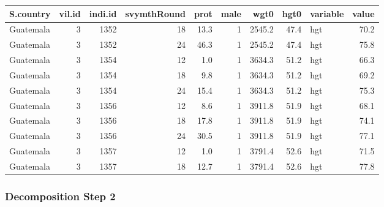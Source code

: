 \documentclass[
]{book}
\newenvironment{Shaded}{\begin{snugshade}}{\end{snugshade}}
\newcommand{\CommentTok}[1]{\textcolor[rgb]{0.56,0.35,0.01}{\textit{#1}}}
\newcommand{\DataTypeTok}[1]{\textcolor[rgb]{0.13,0.29,0.53}{#1}}
\newcommand{\DecValTok}[1]{\textcolor[rgb]{0.00,0.00,0.81}{#1}}
\newcommand{\KeywordTok}[1]{\textcolor[rgb]{0.13,0.29,0.53}{\textbf{#1}}}
\newcommand{\NormalTok}[1]{#1}
\newcommand{\OperatorTok}[1]{\textcolor[rgb]{0.81,0.36,0.00}{\textbf{#1}}}
\newcommand{\StringTok}[1]{\textcolor[rgb]{0.31,0.60,0.02}{#1}}
\begin{document}
\begin{table}[!h]
\centering
\begin{tabular}{l|r|r|r|r|r|r|r|l|r}
\hline
S.country & vil.id & indi.id & svymthRound & prot & male & wgt0 & hgt0 & variable & value\\
\hline
\rowcolor{gray!6}  Guatemala & 3 & 1352 & 18 & 13.3 & 1 & 2545.2 & 47.4 & hgt & 70.2\\
\hline
Guatemala & 3 & 1352 & 24 & 46.3 & 1 & 2545.2 & 47.4 & hgt & 75.8\\
\hline
\rowcolor{gray!6}  Guatemala & 3 & 1354 & 12 & 1.0 & 1 & 3634.3 & 51.2 & hgt & 66.3\\
\hline
Guatemala & 3 & 1354 & 18 & 9.8 & 1 & 3634.3 & 51.2 & hgt & 69.2\\
\hline
\rowcolor{gray!6}  Guatemala & 3 & 1354 & 24 & 15.4 & 1 & 3634.3 & 51.2 & hgt & 75.3\\
\hline
Guatemala & 3 & 1356 & 12 & 8.6 & 1 & 3911.8 & 51.9 & hgt & 68.1\\
\hline
\rowcolor{gray!6}  Guatemala & 3 & 1356 & 18 & 17.8 & 1 & 3911.8 & 51.9 & hgt & 74.1\\
\hline
Guatemala & 3 & 1356 & 24 & 30.5 & 1 & 3911.8 & 51.9 & hgt & 77.1\\
\hline
\rowcolor{gray!6}  Guatemala & 3 & 1357 & 12 & 1.0 & 1 & 3791.4 & 52.6 & hgt & 71.5\\
\hline
Guatemala & 3 & 1357 & 18 & 12.7 & 1 & 3791.4 & 52.6 & hgt & 77.8\\
\hline
\end{tabular}
\end{table}

\hypertarget{decomposition-step-2}{%
\subsubsection{Decomposition Step 2}\label{decomposition-step-2}}

\begin{Shaded}
\end{Shaded}
\end{document}
